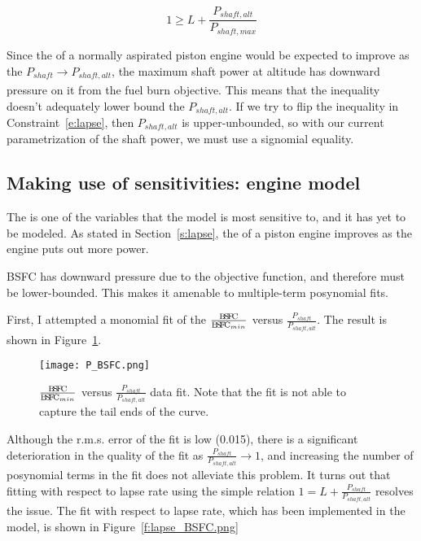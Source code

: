 \begin{equation}
    \label{e:lapse}
    1 \geq L + \frac{P_{shaft,alt}}{P_{shaft,max}}
\end{equation}

Since the \BSFC of a normally aspirated piston engine would be expected to improve
as the $P_{shaft} \xrightarrow[]{} P_{shaft,alt}$, the maximum shaft
power at altitude has downward pressure on it from the fuel burn objective. This means that the
inequality doesn't adequately lower bound the $P_{shaft,alt}$. If we try to flip the inequality in
Constraint~\ref{e:lapse}, then $P_{shaft,alt}$ is upper-unbounded, so with our current parametrization
of the shaft power, we must use a signomial equality.

\subsection{Making use of sensitivities: engine \BSFC model}
\label{s:BSFC}

The \BSFC is one of the variables that the model is most sensitive to, and it has yet to be modeled. As
stated in Section~\ref{s:lapse}, the \BSFC of a piston engine improves as the engine puts out more power.

BSFC has downward pressure due to the objective function, and therefore must be lower-bounded. This makes
it amenable to multiple-term posynomial fits.

First, I attempted a monomial fit of the $\frac{{\rm B\!S\!F\!C}}{{\rm B\!S\!F\!C}_{min}}$ versus $\frac{P_{shaft}}{P_{shaft,alt}}$.
The result is shown in Figure~\ref{f:P_BSFC}.

\begin{center}
    \begin{figure}
        \texttt{[image: P\_BSFC.png]}
        \caption{$\frac{{\rm B\!S\!F\!C}}{{\rm B\!S\!F\!C}_{min}}$ versus $\frac{P_{shaft}}{P_{shaft,alt}}$ data fit. Note that the fit is
        not able to capture the tail ends of the curve.}
        \label{f:P_BSFC}
    \end{figure}
\end{center}

Although the r.m.s. error of the fit is low (0.015), there is a significant deterioration in the quality of the
fit as $\frac{P_{shaft}}{P_{shaft,alt}} \xrightarrow[]{} 1$,
and increasing the number of posynomial terms in the fit does not alleviate this problem. It
turns out that fitting with respect to lapse rate using the simple relation $1 = L + \frac{P_{shaft}}{P_{shaft,alt}}$
resolves the issue. The fit with respect to lapse rate, which has been implemented in the model, is
shown in Figure~\ref{f:lapse_BSFC.png}

